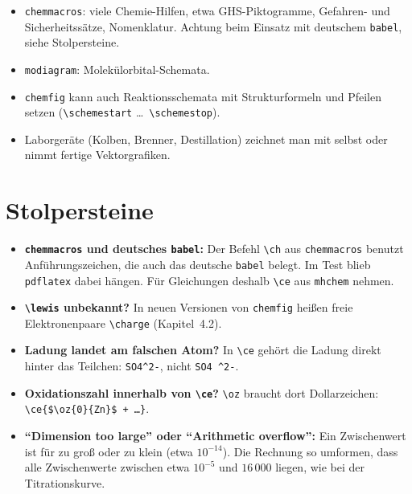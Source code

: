 \begin{itemize}
	\item \texttt{chemmacros}: viele Chemie-Hilfen, etwa GHS-Piktogramme, Gefahren- und Sicherheitssätze, Nomenklatur. Achtung beim Einsatz mit deutschem \texttt{babel}, siehe Stolpersteine.
	\item \texttt{modiagram}: Molekülorbital-Schemata.
	\item \texttt{chemfig} kann auch Reaktionsschemata mit Strukturformeln und Pfeilen setzen (\texttt{\textbackslash schemestart} \dots\ \texttt{\textbackslash schemestop}).
	\item Laborgeräte (Kolben, Brenner, Destillation) zeichnet man mit \TikZ selbst oder nimmt fertige Vektorgrafiken.
\end{itemize}



\section{Stolpersteine}

\begin{itemize}
	\item \textbf{\texttt{chemmacros} und deutsches \texttt{babel}:} Der Befehl \texttt{\textbackslash ch} aus \texttt{chemmacros} benutzt Anführungszeichen, die auch das deutsche \texttt{babel} belegt. Im Test blieb \texttt{pdflatex} dabei hängen. Für Gleichungen deshalb \texttt{\textbackslash ce} aus \texttt{mhchem} nehmen.
	\item \textbf{\texttt{\textbackslash lewis} unbekannt?} In neuen Versionen von \texttt{chemfig} heißen freie Elektronenpaare \texttt{\textbackslash charge} (Kapitel~4.2).
	\item \textbf{Ladung landet am falschen Atom?} In \texttt{\textbackslash ce} gehört die Ladung direkt hinter das Teilchen: \texttt{SO4\^{}2-}, nicht \texttt{SO4 \^{}2-}.
	\item \textbf{Oxidationszahl innerhalb von \texttt{\textbackslash ce}?} \texttt{\textbackslash oz} braucht dort Dollarzeichen: \texttt{\textbackslash ce\{\$\textbackslash oz\{0\}\{Zn\}\$ + \dots\}}.
	\item \textbf{\enquote{Dimension too large} oder \enquote{Arithmetic overflow}:} Ein Zwischenwert ist für \TikZ zu groß oder zu klein (etwa $10^{-14}$). Die Rechnung so umformen, dass alle Zwischenwerte zwischen etwa $10^{-5}$ und $16\,000$ liegen, wie bei der Titrationskurve.
\end{itemize}



